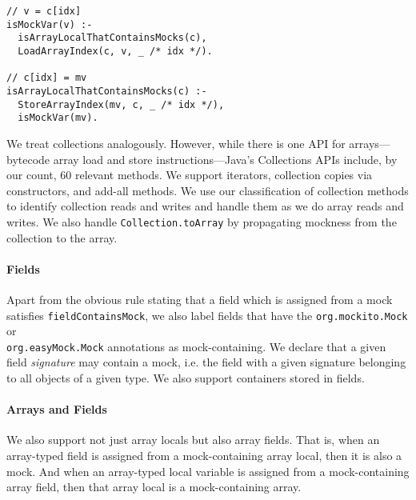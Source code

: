 \begin{lstlisting}[basicstyle=\ttfamily\small,numbers=none,caption={Rules for handling arrays.}]
// v = c[idx]
isMockVar(v) :-
  isArrayLocalThatContainsMocks(c),
  LoadArrayIndex(c, v, _ /* idx */).

// c[idx] = mv
isArrayLocalThatContainsMocks(c) :-
  StoreArrayIndex(mv, c, _ /* idx */),
  isMockVar(mv).
\end{lstlisting}

We treat collections analogously. However, while there is one API for arrays---bytecode array load and store instructions---Java's Collections APIs include, by our count, 60 relevant methods. We support iterators, collection copies via constructors, and add-all methods. We use our classification of collection methods to identify collection reads and writes and handle them as we do array reads and writes. We also handle {\tt Collection.toArray} by propagating mockness from the collection to the array.%

\paragraph{Fields} Apart from the obvious rule stating that a field which is assigned from a mock satisfies {\tt fieldContainsMock}, we also label fields that have the {\tt org.mockito.Mock} or \\{\tt org.easyMock.Mock} annotations as mock-containing. We declare that a given field \emph{signature} may contain a mock, i.e. the field with a given signature belonging to all objects of a given type. We also support containers stored in fields.

\paragraph{Arrays and Fields} We also support not just array locals but also array fields. That is, when an array-typed field is assigned from a mock-containing array local, then it is also a mock. And when an array-typed local variable is assigned from a mock-containing array field, then that array local is a mock-containing array.

